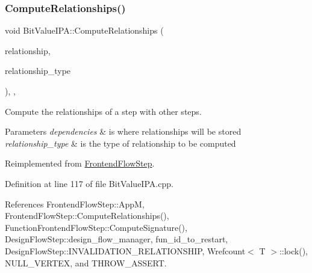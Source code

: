 \mbox{\label{classBitValueIPA_a0599406c42da912fe0c0d768bf52e73a}} 
\subsubsection{\texorpdfstring{Compute\+Relationships()}{ComputeRelationships()}}
{\footnotesize\ttfamily void Bit\+Value\+I\+P\+A\+::\+Compute\+Relationships (\begin{DoxyParamCaption}\item[{\hyperlink{classDesignFlowStepSet}{Design\+Flow\+Step\+Set} \&}]{relationship,  }\item[{const \hyperlink{classDesignFlowStep_a723a3baf19ff2ceb77bc13e099d0b1b7}{Design\+Flow\+Step\+::\+Relationship\+Type}}]{relationship\+\_\+type }\end{DoxyParamCaption})\hspace{0.3cm}{\ttfamily [override]}, {\ttfamily [protected]}, {\ttfamily [virtual]}}



Compute the relationships of a step with other steps. 


\begin{DoxyParams}{Parameters}
{\em dependencies} & is where relationships will be stored \\
\hline
{\em relationship\+\_\+type} & is the type of relationship to be computed \\
\hline
\end{DoxyParams}


Reimplemented from \hyperlink{classFrontendFlowStep_a532ee0d76d7a10c373b4a7478a7eee18}{Frontend\+Flow\+Step}.



Definition at line 117 of file Bit\+Value\+I\+P\+A.\+cpp.



References Frontend\+Flow\+Step\+::\+AppM, Frontend\+Flow\+Step\+::\+Compute\+Relationships(), Function\+Frontend\+Flow\+Step\+::\+Compute\+Signature(), Design\+Flow\+Step\+::design\+\_\+flow\+\_\+manager, fun\+\_\+id\+\_\+to\+\_\+restart, Design\+Flow\+Step\+::\+I\+N\+V\+A\+L\+I\+D\+A\+T\+I\+O\+N\+\_\+\+R\+E\+L\+A\+T\+I\+O\+N\+S\+H\+IP, Wrefcount$<$ T $>$\+::lock(), N\+U\+L\+L\+\_\+\+V\+E\+R\+T\+EX, and T\+H\+R\+O\+W\+\_\+\+A\+S\+S\+E\+RT.

